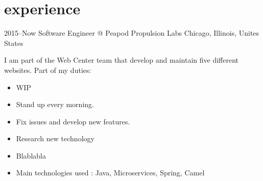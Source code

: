 \documentclass[]{friggeri-cv} %
\begin{document}

\section{experience}


\begin{entrylist}

\entry
{2015--Now}
{Software Engineer} 
{@ Peapod Propulsion Labs}
{Chicago, Illinois, Unites States}
{I am part of the Web Center team that develop and maintain five different websites. Part of my duties:\\

\vspace{-4mm}
\begin{itemize}
	\item WIP
	\item Stand up every morning.
	\item Fix issues and develop new features.
	\item Research new technology
	\item Blablabla
	\item Main technologies used : Java, Microservices, Spring, Camel
\end{itemize}}
\vspace{-7mm}

\end{entrylist}

\end{document}
